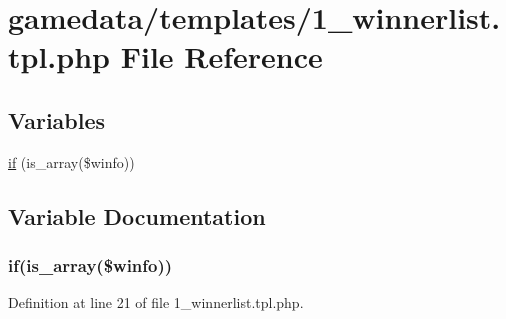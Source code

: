 \hypertarget{1__winnerlist_8tpl_8php}{\section{gamedata/templates/1\+\_\+winnerlist.tpl.\+php File Reference}
\label{1__winnerlist_8tpl_8php}
}
\subsection*{Variables}
\begin{DoxyCompactItemize}
\item 
\hyperlink{1__winnerlist_8tpl_8php_aef405f2283523f86308da08720a184cb}{if} (is\+\_\+array(\$winfo))
\end{DoxyCompactItemize}


\subsection{Variable Documentation}
\hypertarget{1__winnerlist_8tpl_8php_aef405f2283523f86308da08720a184cb}{
\subsubsection[{if}]{\setlength{\rightskip}{0pt plus 5cm}if(is\+\_\+array(\$winfo))}}\label{1__winnerlist_8tpl_8php_aef405f2283523f86308da08720a184cb}


Definition at line 21 of file 1\+\_\+winnerlist.\+tpl.\+php.

